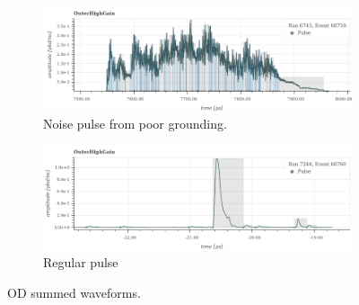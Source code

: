 \begin{figure}[!htbp]
\begin{subfigure}{\textwidth}
  \centering
  \includegraphics[width=\linewidth]{Figures/OD_Backgrounds/noise_pulse.png}
  \caption{Noise pulse from poor grounding.}
  \label{fig:noise_od_waveform}
  \end{subfigure}
  \begin{subfigure}{\textwidth}
  \centering
  \includegraphics[width=\linewidth]{Figures/OD_Backgrounds/regular_pulse.png}
  \caption{Regular pulse}
  \label{fig:regular_od_waveform}
  \end{subfigure}
\caption{OD summed waveforms.}
\label{fig:od_noise_cut_waveforms}
\end{figure}